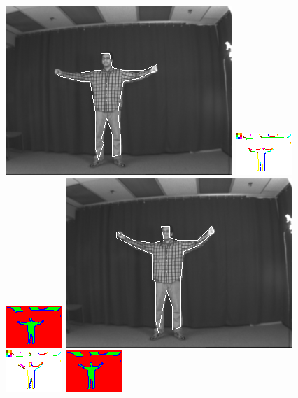 \documentclass{tufte-book}
\begin{document}
\begin{figure}
\includegraphics[width=0.3 \linewidth]{output/2.detection/image_parsing/out.4.d/thefinalparse.png}
\includegraphics[width=0.3 \linewidth]{output/2.detection/image_parsing/out.4.d/local.x5.orientations.png}
\includegraphics[width=0.3 \linewidth]{output/2.detection/image_parsing/out.4.d/local.x5.interior.png}
\includegraphics[width=0.3 \linewidth]{output/2.detection/image_parsing/out.5.d/thefinalparse.png}
\includegraphics[width=0.3 \linewidth]{output/2.detection/image_parsing/out.5.d/local.x5.orientations.png}
\includegraphics[width=0.3 \linewidth]{output/2.detection/image_parsing/out.5.d/local.x5.interior.png}

\end{figure}
\end{document}
